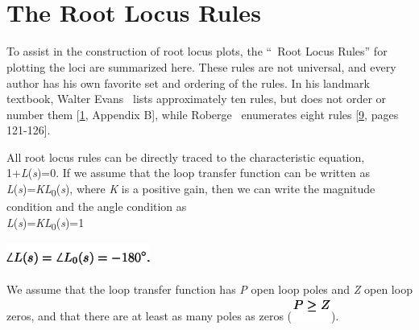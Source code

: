 \documentclass[16pt]{article}
\begin{document}
\section[ \\
The Root Locus
Rules]{\texorpdfstring{\protect\hypertarget{SECTION00080000000000000000}{}{~}
		\protect\hypertarget{app.rlrules}{}{~}\\
		The Root Locus
		Rules}{~ ~ The Root Locus Rules}}\label{the-root-locus-rules}

To assist in the construction of root locus plots, the
``\protect\hypertarget{2261}{}{~}Root Locus Rules'' for plotting the
loci are summarized here. These rules are not universal, and every
author has his own favorite set and ordering of the rules. In his
landmark textbook, Walter Evans\protect\hypertarget{2250}{}{~} lists
approximately ten rules, but does not order or number them
{[}\href{http://www.mit.edu/people/klund/weblatex/node10.html\#evans54}{1},
Appendix B{]}, while Roberge\protect\hypertarget{2252}{}{~} enumerates
eight rules
{[}\href{http://www.mit.edu/people/klund/weblatex/node10.html\#roberge}{9},
pages 121-126{]}.

All root locus rules can be directly traced to the characteristic
equation, 1+\emph{L}(\emph{s})=0. If we assume that the loop transfer
function can be written as
\emph{L}(\emph{s})=\emph{KL}\textsubscript{0}(\emph{s}), where \emph{K}
is a positive gain, then we can write the magnitude condition and the
angle condition as\\

\textbar{}\emph{L}(\emph{s})\textbar{}=\textbar{}\emph{KL}\textsubscript{0}(\emph{s})\textbar{}=1

\includegraphics[width=1.85417in,height=0.29167in]{./The Root Locus Rules_files/img46.png}

We assume that the loop transfer function has \emph{P} open loop poles
and \emph{Z} open loop zeros, and that there are at least as many poles
as zeros
(\includegraphics[width=0.51042in,height=0.30208in]{./The Root Locus Rules_files/img47.png}).
\end{document}
